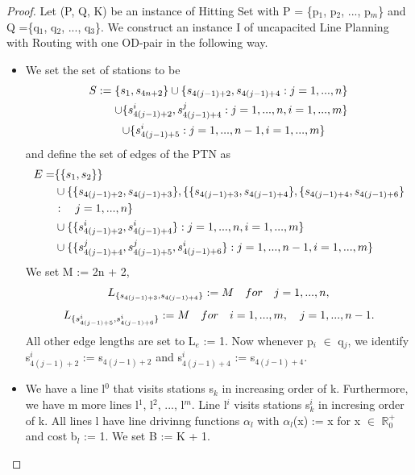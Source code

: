 \documentclass[
  twoside,
  11pt, a4paper,
  footinclude=true,
  headinclude=true,
  cleardoublepage=empty
]{book}
\theoremstyle{definition}
\begin{document}
\begin{proof} 
Let (P, Q, K) be an instance of Hitting Set with P = \{p$_1$, p$_2$, ..., p$_m$\} and Q =\{q$_1$, q$_2$, ..., q$_3$\}. We construct an instance I of uncapacited Line Planning with Routing with one OD-pair in the following way.
\begin{itemize}
\item We set the set of stations to be 
\begin{equation} \notag
\begin{split}
S := \{s_1, s_{4n+2}\} \cup \{s_{4(j-1)+2}, s_{4(j-1)+4} : j = 1, ..., n\} \\ \cup \{s^i_{4(j-1)+2}, s^j_{4(j-1)+4} : j = 1, ..., n, i = 1, ..., m\} \\ \cup \{s^i_{4(j-1)+5} : j = 1, ..., n-1, i = 1, ..., m\} \quad \quad 
\end{split}
\end{equation}
and define the set of edges of the PTN as
\begin{equation} \notag
\begin{split}
E = &\{\{s_1, s_2\}\} \\ &\cup \{\{s_{4(j-1)+2}, s_{4(j-1)+3}\}, \{\{s_{4(j-1)+3}, s_{4(j-1)+4}\}, \{s_{4(j-1)+4}, s_{4(j-1)+6}\}\\ &: \quad j = 1, ..., n\} \\ \quad &\cup \{\{s^i_{4(j-1)+2}, s^i_{4(j-1)+4}\} : j = 1, ..., n, i = 1, ..., m\} \\ &\cup \{\{s^j_{4(j-1)+4}, s^j_{4(j-1)+5}, s^i_{4(j-1)+6}\} : j = 1, ..., n-1, i = 1, ..., m\}
\end{split}
\end{equation}
We set M := 2n + 2,
\begin{equation} \notag
L_{\{s_{4(j-1)+3},s_{4(j-1)+4}\}} := M \quad for \quad j = 1,..., n, 
\end{equation}
\begin{equation} \notag
L_{\{s^i_{4(j-1)+5},s^i_{4(j-1)+6}\}} := M \quad for \quad i = 1,..., m,\quad j = 1,..., n-1.
\end{equation}
All other edge lengths are set to L$_e$ := 1.\newline
Now whenever p$_i$ $\in$ q$_j$, we identify s$^i_{4(j-1)+2}$ := s$_{4(j-1)+2}$ and s$^i_{4(j-1)+4}$ := s$_{4(j-1)+4}$.
\item We have a line l$^0$ that visits stations s$_k$ in increasing order of k. Furthermore, we have m more lines l$^1$, l$^2$, ..., l$^m$. Line l$^i$ visits stations s$^i_k$ in incresing order of k. All lines l have line drivinng functions $\alpha_l$ with $\alpha_l$(x) := x for x $\in$ $\mathbb{R}^+_0$ and cost b$_l$ := 1. We set B := K + 1.

\end{itemize}
\end{proof}
\end{document}
